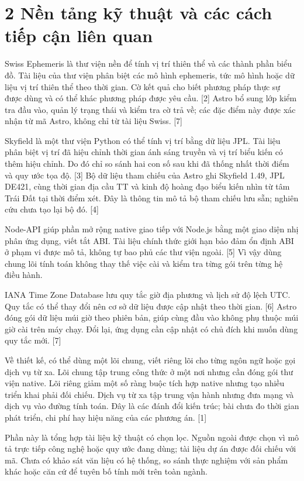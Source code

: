 \documentclass[11pt,a4paper]{article}
\begin{document}
\section*{2 Nền tảng kỹ thuật và các cách tiếp cận liên quan}
Swiss Ephemeris là thư viện nền để tính vị trí thiên thể và các thành phần biểu đồ. Tài liệu của thư viện phân biệt các mô hình ephemeris, tức mô hình hoặc dữ liệu vị trí thiên thể theo thời gian. Cờ kết quả cho biết phương pháp thực sự được dùng và có thể khác phương pháp được yêu cầu. [2] Astro bổ sung lớp kiểm tra đầu vào, quản lý trạng thái và kiểm tra cờ trả về; các đặc điểm này được xác nhận từ mã Astro, không chỉ từ tài liệu Swiss. [7]


Skyfield là một thư viện Python có thể tính vị trí bằng dữ liệu JPL. Tài liệu phân biệt vị trí đã hiệu chỉnh thời gian ánh sáng truyền và vị trí biểu kiến có thêm hiệu chỉnh. Do đó chỉ so sánh hai con số sau khi đã thống nhất thời điểm và quy ước tọa độ. [3] Bộ dữ liệu tham chiếu của Astro ghi Skyfield 1.49, JPL DE421, cùng thời gian địa cầu TT và kinh độ hoàng đạo biểu kiến nhìn từ tâm Trái Đất tại thời điểm xét. Đây là thông tin mô tả bộ tham chiếu lưu sẵn; nghiên cứu chưa tạo lại bộ đó. [4]


Node-API giúp phần mở rộng native giao tiếp với Node.js bằng một giao diện nhị phân ứng dụng, viết tắt ABI. Tài liệu chính thức giới hạn bảo đảm ổn định ABI ở phạm vi được mô tả, không tự bao phủ các thư viện ngoài. [5] Vì vậy dùng chung lõi tính toán không thay thế việc cài và kiểm tra từng gói trên từng hệ điều hành.


IANA Time Zone Database lưu quy tắc giờ địa phương và lịch sử độ lệch UTC. Quy tắc có thể thay đổi nên cơ sở dữ liệu được cập nhật theo thời gian. [6] Astro đóng gói dữ liệu múi giờ theo phiên bản, giúp cùng đầu vào không phụ thuộc múi giờ cài trên máy chạy. Đổi lại, ứng dụng cần cập nhật có chủ đích khi muốn dùng quy tắc mới. [7]


Về thiết kế, có thể dùng một lõi chung, viết riêng lõi cho từng ngôn ngữ hoặc gọi dịch vụ từ xa. Lõi chung tập trung công thức ở một nơi nhưng cần đóng gói thư viện native. Lõi riêng giảm một số ràng buộc tích hợp native nhưng tạo nhiều triển khai phải đối chiếu. Dịch vụ từ xa tập trung vận hành nhưng đưa mạng và dịch vụ vào đường tính toán. Đây là các đánh đổi kiến trúc; bài chưa đo thời gian phát triển, chi phí hay hiệu năng của các phương án. [1]


Phần này là tổng hợp tài liệu kỹ thuật có chọn lọc. Nguồn ngoài được chọn vì mô tả trực tiếp công nghệ hoặc quy ước đang dùng; tài liệu dự án được đối chiếu với mã. Chưa có khảo sát văn liệu có hệ thống, so sánh thực nghiệm với sản phẩm khác hoặc căn cứ để tuyên bố tính mới trên toàn ngành.
\end{document}
